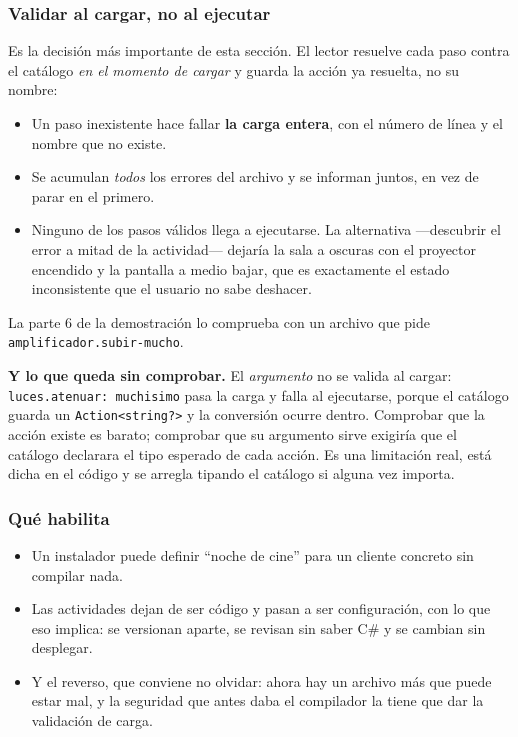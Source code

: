 \subsubsection*{Validar al cargar, no al ejecutar}

Es la decisión más importante de esta sección. El lector resuelve cada paso contra el catálogo
\emph{en el momento de cargar} y guarda la acción ya resuelta, no su nombre:

\begin{itemize}[leftmargin=1.2cm]
    \item Un paso inexistente hace fallar \textbf{la carga entera}, con el número de línea y
          el nombre que no existe.
    \item Se acumulan \emph{todos} los errores del archivo y se informan juntos, en vez de
          parar en el primero.
    \item Ninguno de los pasos válidos llega a ejecutarse. La alternativa —descubrir el error
          a mitad de la actividad— dejaría la sala a oscuras con el proyector encendido y la
          pantalla a medio bajar, que es exactamente el estado inconsistente que el usuario
          no sabe deshacer.
\end{itemize}

La parte 6 de la demostración lo comprueba con un archivo que pide
\texttt{amplificador.subir-mucho}.

\textbf{Y lo que queda sin comprobar.} El \emph{argumento} no se valida al cargar:
\texttt{luces.atenuar: muchisimo} pasa la carga y falla al ejecutarse, porque el catálogo
guarda un \texttt{Action<string?>} y la conversión ocurre dentro. Comprobar que la acción
existe es barato; comprobar que su argumento sirve exigiría que el catálogo declarara el tipo
esperado de cada acción. Es una limitación real, está dicha en el código y se arregla tipando
el catálogo si alguna vez importa.

\subsubsection*{Qué habilita}

\begin{itemize}[leftmargin=1.2cm]
    \item Un instalador puede definir ``noche de cine'' para un cliente concreto sin
          compilar nada.
    \item Las actividades dejan de ser código y pasan a ser configuración, con lo que eso
          implica: se versionan aparte, se revisan sin saber C\# y se cambian sin desplegar.
    \item Y el reverso, que conviene no olvidar: ahora hay un archivo más que puede estar mal,
          y la seguridad que antes daba el compilador la tiene que dar la validación de carga.
\end{itemize}

